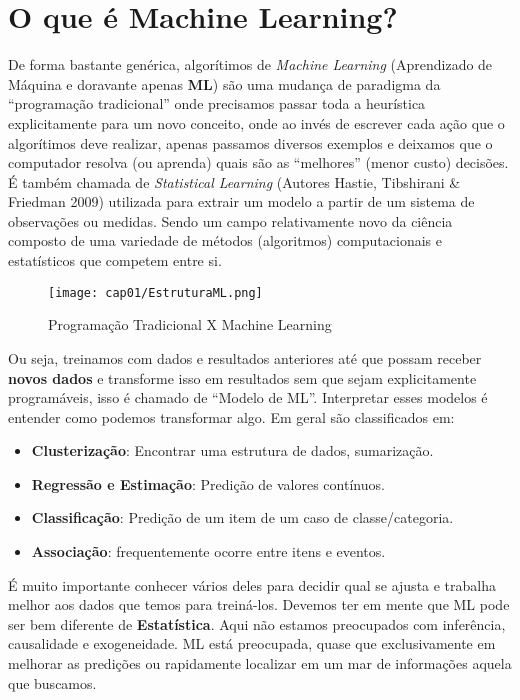 \section{O que é Machine Learning?}
De forma bastante genérica, algorítimos de \textit{Machine Learning} (Aprendizado de Máquina e doravante apenas \textbf{ML}) são uma mudança de paradigma da “programação tradicional” onde precisamos passar toda a heurística explicitamente para um novo conceito, onde ao invés de escrever cada ação que o algorítimos deve realizar, apenas passamos diversos exemplos e deixamos que o computador resolva (ou aprenda) quais são as “melhores” (menor custo) decisões. É também chamada de \textit{Statistical Learning} (Autores Hastie, Tibshirani \& Friedman 2009) utilizada para extrair um modelo a partir de um sistema de observações ou medidas. Sendo um campo relativamente novo da ciência composto de uma variedade de métodos (algoritmos) computacionais e estatísticos que competem entre si.
\begin{figure}[H]
	\centering
	\texttt{[image: cap01/EstruturaML.png]}
	\caption{Programação Tradicional X Machine Learning}
\end{figure}

Ou seja, treinamos com dados e resultados anteriores até que possam receber \textbf{novos dados} e transforme isso em resultados sem que sejam explicitamente programáveis, isso é chamado de ``Modelo de ML''. Interpretar esses modelos é entender como podemos transformar algo. Em geral são classificados em:
\begin{itemize}[noitemsep]
	\item \textbf{Clusterização}: Encontrar uma estrutura de dados, sumarização.
	\item \textbf{Regressão e Estimação}: Predição de valores contínuos.
	\item \textbf{Classificação}: Predição de um item de um caso de classe/categoria.
	\item \textbf{Associação}: frequentemente ocorre entre itens e eventos.
\end{itemize}

É muito importante conhecer vários deles para decidir qual se ajusta e trabalha melhor aos dados que temos para treiná-los. Devemos ter em mente que ML pode ser bem diferente de \textbf{Estatística}. Aqui não estamos preocupados com inferência, causalidade e exogeneidade. ML está preocupada, quase que exclusivamente em melhorar as predições ou rapidamente localizar em um mar de informações aquela que buscamos. 

